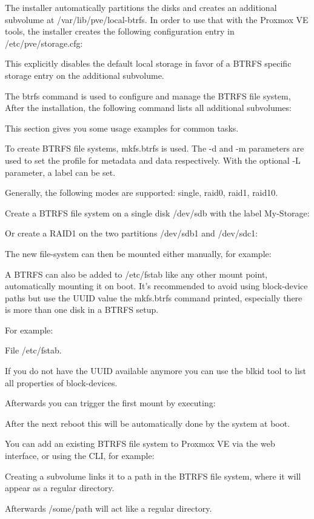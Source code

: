 The installer automatically partitions the disks and creates an additional subvolume at /var/lib/pve/local-btrfs. In order to use that with the Proxmox VE tools, the installer creates the following configuration entry in /etc/pve/storage.cfg:

This explicitly disables the default local storage in favor of a BTRFS specific storage entry on the additional subvolume.

The btrfs command is used to configure and manage the BTRFS file system, After the installation, the following command lists all additional subvolumes:

This section gives you some usage examples for common tasks.

To create BTRFS file systems, mkfs.btrfs is used. The -d and -m parameters are used to set the profile for metadata and data respectively. With the optional -L parameter, a label can be set.

Generally, the following modes are supported: single, raid0, raid1, raid10.

Create a BTRFS file system on a single disk /dev/sdb with the label My-Storage:

Or create a RAID1 on the two partitions /dev/sdb1 and /dev/sdc1:

The new file-system can then be mounted either manually, for example:

A BTRFS can also be added to /etc/fstab like any other mount point, automatically mounting it on boot. It’s recommended to avoid using block-device paths but use the UUID value the mkfs.btrfs command printed, especially there is more than one disk in a BTRFS setup.

For example:

File /etc/fstab.

If you do not have the UUID available anymore you can use the blkid tool to list all properties of block-devices.

Afterwards you can trigger the first mount by executing:

After the next reboot this will be automatically done by the system at boot.

You can add an existing BTRFS file system to Proxmox VE via the web interface, or using the CLI, for example:

Creating a subvolume links it to a path in the BTRFS file system, where it will appear as a regular directory.

Afterwards /some/path will act like a regular directory.

